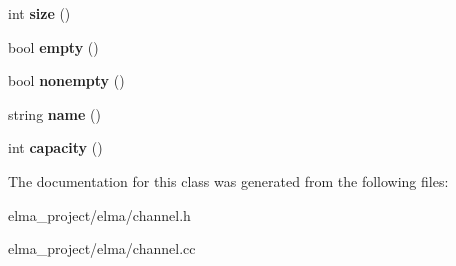 \begin{DoxyCompactItemize}
int {\bfseries size} ()
\item 
\mbox{\label{classelma_1_1_channel_a4367ee6a207ae6a88aac08eee69009f4}} 
bool {\bfseries empty} ()
\item 
\mbox{\label{classelma_1_1_channel_abe80362963b8fb50c05b52f7fe299fb0}} 
bool {\bfseries nonempty} ()
\item 
\mbox{\label{classelma_1_1_channel_acb13251d4dfd40980e2d73f24d8900ee}} 
string {\bfseries name} ()
\item 
\mbox{\label{classelma_1_1_channel_ae813178d76524eb828b2cf73207c4b50}} 
int {\bfseries capacity} ()
\end{DoxyCompactItemize}


The documentation for this class was generated from the following files\+:\begin{DoxyCompactItemize}
\item 
elma\+\_\+project/elma/channel.\+h\item 
elma\+\_\+project/elma/channel.\+cc\end{DoxyCompactItemize}
